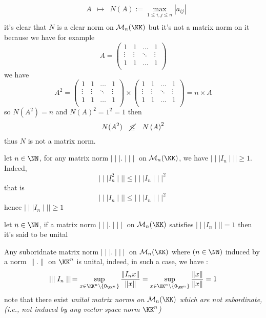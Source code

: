 \begin{example}
\begin{itemize}
\[\begin{array}{cccc}
		           &   A& \longmapsto     & N \left( A \right) := 
			   \max _{1 \leq i,j \leq n} \left| a_{ij} \right|\\ 
		\end{array}
		\]
		it's clear that $N$ is a clear norm on $\mathcal{M}_{n} (\KK) $  but it's not
		a matrix norm on it because we have for example 
		\[
			A = 
			\begin{pmatrix}
				1 & 1 & \hdots  &1  \\
				\vdots & \vdots   & \ddots   & \vdots  \\
				 1& 1 & \hdots   & 1  \\
			\end{pmatrix} 
		\]
		we have 
		\[
			A ^2 = 
			\begin{pmatrix}
				1 & 1 & \hdots  &1  \\
				\vdots & \vdots   & \ddots   & \vdots  \\
				 1& 1 & \hdots   & 1  \\
			\end{pmatrix} 
			\times  
			\begin{pmatrix}
				1 & 1 & \hdots  &1  \\
				\vdots & \vdots   & \ddots   & \vdots  \\
				 1& 1 & \hdots   & 1  \\
			\end{pmatrix} 
			= n \times A 
		\]
		so $N \left( A^2  \right) = n$ and $N \left( A \right)^2 = 1 ^2  = 1$  
		then 
		\[
		N (A^2 ) 
		\quad 
		\cancel{ \leq }  \quad 
		 N \left( A \right)^2 
		\]
		thus $N$ is not a matrix norm.
\end{itemize}
\end{example}
\begin{remark}[]
let $n \in \NN$, for any matrix norm $\mid \mid \mid  . \mid \mid \mid $  on 
$\mathcal{M} _{n}(\KK) $, we have $\mid \mid \mid  I_{n} \mid \mid \mid \geq 1$. Indeed, 
\[
\mid \mid \mid  I_{n}^2  \mid \mid \mid  \leq 
\mid \mid \mid  I_{n} \mid \mid \mid ^2 
\]
that is 
\[
\mid \mid \mid  I_{n} \mid \mid \mid  \leq 
\mid \mid \mid  I_{n} \mid \mid \mid ^2 
\]
hence $\mid \mid \mid  I_{n} \mid \mid \mid \geq 1$ 
\end{remark}
\begin{definition}[]
let $n \in \NN$, if a matrix norm $\mid \mid \mid  . \mid \mid \mid $  on 
$\mathcal{M} _{n}(\KK) $ satisfies $\mid \mid \mid  I_{n} \mid \mid \mid  =1$  then it's 
said to be unital
\end{definition}
\begin{example}
	Any suboridnate matrix norm $\mid \mid \mid  . \mid \mid \mid $  
	on $\mathcal{M} _{n}(\KK) $ where $\left( n \in \NN \right)$  induced
	by a norm $\| . \|$ on $\KK^n$ is unital, indeed, in such a case, we have :
	\[
	\mid \mid \mid  I_{n} \mid \mid \mid  = 
	\sup_{x \in \KK^n \backslash  \left\{ 0_{\KK^n } \right\}}  
	\frac{\| I_{n} x \| }{ \| x \| } = 
	\sup_{x \in \KK^n \backslash \left\{ 0_{\KK^n } \right\}}  
	\frac{\| x \| }{\| x \| } = 1
	\]
	note that there exist \it unital matrix norms \normalfont
	on $\mathcal{M}_{n}(\KK)  $  which are not subordinate, (i.e., 
	not induced by any vector space norm $\KK^n $)
\end{example}
